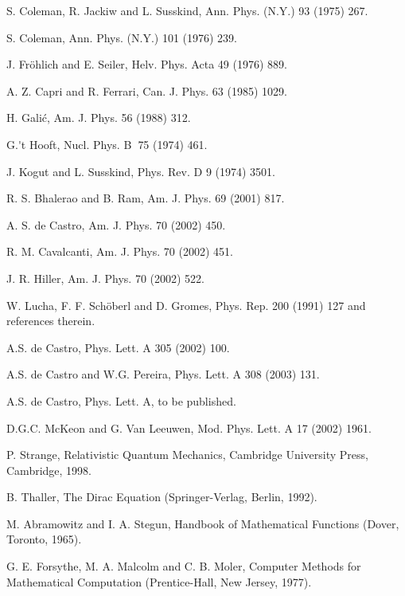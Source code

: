\documentclass[a4paper,12pt,titlepage]{article}
\begin{document}
\begin{thebibliography}{99}
  S. Coleman, R. Jackiw and L. Susskind, Ann. Phys. (N.Y.) 93
(1975) 267.

  S. Coleman, Ann. Phys. (N.Y.) 101 (1976) 239.

  J. Fr\"{o}hlich and E. Seiler, Helv. Phys. Acta 49 (1976) 889.

  A. Z. Capri and R. Ferrari, Can. J. Phys. 63 (1985) 1029.

  H. Gali\'{c}, Am. J. Phys. 56 (1988) 312.

  G.\'{}t Hooft, Nucl. Phys. B\textbf{\ }75 (1974) 461.

  J. Kogut and L. Susskind, Phys. Rev. D 9 (1974) 3501.

  R. S. Bhalerao and B. Ram, Am. J. Phys. 69 (2001) 817.

  A. S. de Castro, Am. J. Phys. 70 (2002) 450.

  R. M. Cavalcanti, Am. J. Phys. 70 (2002) 451.

  J. R. Hiller, Am. J. Phys. 70 (2002) 522.

  W. Lucha, F. F. Sch\"{o}berl and D. Gromes, Phys. Rep. 200
(1991) 127 and references therein.

  A.S. de Castro, Phys. Lett. A 305 (2002) 100.

  A.S. de Castro and W.G. Pereira, Phys. Lett. A 308 (2003)
131.

  A.S. de Castro, Phys. Lett. A, to be published.

  D.G.C. McKeon and G. Van Leeuwen, Mod. Phys. Lett. A 17
(2002) 1961.

  P. Strange, Relativistic Quantum Mechanics, Cambridge
University Press, Cambridge, 1998.

  B. Thaller, The Dirac Equation (Springer-Verlag, Berlin,
1992).

  M. Abramowitz and I. A. Stegun, Handbook of Mathematical
Functions (Dover, Toronto, 1965).

  G. E. Forsythe, M. A. Malcolm and C. B. Moler, Computer
Methods for Mathematical Computation (Prentice-Hall, New Jersey, 1977).
\end{thebibliography}
\end{document}
